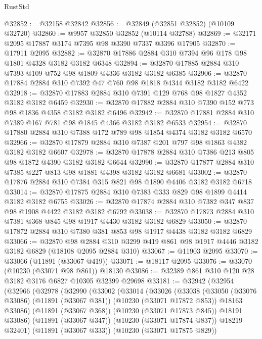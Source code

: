 \begin{lexlean}{RustStd}
\begin{coremodule}
@32852 := @32158 @32842
@32856 := @32849 (@32851 @32852) (@10109 @32720)
@32860 := @9957 @32850 @32852 (@10114 @32788)
@32869 := @32171 @2095 @17887 @3174 @7395 @98 @3390 @7337 @3396 @17905
@32870 := @17911 @2095
@32882 := @32870 @17886 @2884 @310 @7394 @96 @178 @98 @1801 @4328 @3182 @3182 @6348
@32894 := @32870 @17885 @2884 @310 @7393 @109 @752 @98 @1809 @4336 @3182 @3182 @6385
@32906 := @32870 @17884 @2884 @310 @7392 @47 @760 @98 @1818 @4344 @3182 @3182 @6422
@32918 := @32870 @17883 @2884 @310 @7391 @129 @768 @98 @1827 @4352 @3182 @3182 @6459
@32930 := @32870 @17882 @2884 @310 @7390 @152 @773 @98 @1836 @4358 @3182 @3182 @6496
@32942 := @32870 @17881 @2884 @310 @7389 @167 @781 @98 @1845 @4366 @3182 @3182 @6533
@32954 := @32870 @17880 @2884 @310 @7388 @172 @789 @98 @1854 @4374 @3182 @3182 @6570
@32966 := @32870 @17879 @2884 @310 @7387 @201 @797 @98 @1863 @4382 @3182 @3182 @6607
@32978 := @32870 @17878 @2884 @310 @7386 @213 @805 @98 @1872 @4390 @3182 @3182 @6644
@32990 := @32870 @17877 @2884 @310 @7385 @227 @813 @98 @1881 @4398 @3182 @3182 @6681
@33002 := @32870 @17876 @2884 @310 @7384 @315 @821 @98 @1890 @4406 @3182 @3182 @6718
@33014 := @32870 @17875 @2884 @310 @7383 @333 @829 @98 @1899 @4414 @3182 @3182 @6755
@33026 := @32870 @17874 @2884 @310 @7382 @347 @837 @98 @1908 @4422 @3182 @3182 @6792
@33038 := @32870 @17873 @2884 @310 @7381 @368 @845 @98 @1917 @4430 @3182 @3182 @6829
@33050 := @32870 @17872 @2884 @310 @7380 @381 @853 @98 @1917 @4438 @3182 @3182 @6829
@33066 := @32870
    @98
    @2884
    @310
    @3299
    @419
    @861
    @98
    @1917
    @4446
    @3182
    @3182
    @6829
    (@18108 @2095 @2884 @310)
@33067 := @11903 @2095
@33070 := @33066 (@11891 (@33067 @419))
@33071 := @18117 @2095
@33076 := @33070 (@10230 (@33071 @98 @861)) @18130
@33086 := @32389 @861 @310 @120 @28 @3182 @3176 @6827 @10305 @32399 @29698
@33181 := @32942
    (@32954
      (@32966
        (@32978
          (@32990
            (@33002
              (@33014
                (@33026
                  (@33038
                    (@33050
                      (@33076 @33086)
                      (@11891 (@33067 @381))
                      (@10230 (@33071 @17872 @853))
                      @18163
                      @33086)
                    (@11891 (@33067 @368))
                    (@10230 (@33071 @17873 @845))
                    @18191
                    @33086)
                  (@11891 (@33067 @347))
                  (@10230 (@33071 @17874 @837))
                  @18219
                  @32401)
                (@11891 (@33067 @333))
                (@10230 (@33071 @17875 @829))

\end{coremodule}
\end{lexlean}
